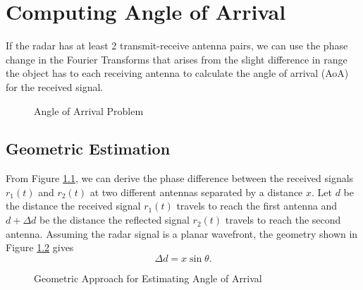 \chapter{Computing Angle of Arrival}
If the radar has at least 2 transmit-receive antenna pairs, we can use the
phase change in the Fourier Transforms that arises from the slight difference
in range the object has to each receiving antenna to calculate the angle of
arrival (AoA) for the received signal. 

\begin{figure}[h]
	\center
	\caption{Angle of Arrival Problem}
	\label{fig:angle-of-arrival}
\end{figure}

\section{Geometric Estimation}
From Figure \ref{fig:angle-of-arrival}, we can derive the phase difference
between the received signals $r_1(t)$ and $r_2(t)$ at two different antennas
separated by a distance $x$. Let $d$ be the distance the received signal
$r_1(t)$ travels to reach the first antenna  and $ d + \Delta d$ be the distance
the reflected signal $r_2(t)$ travels to reach the second antenna. Assuming the
radar signal is a planar wavefront, the geometry shown in Figure
\ref{fig:geometric-aoa} gives
\begin{equation}
	\Delta d = x \sin \theta. 
\end{equation}
\begin{figure}
	\center
	\caption{Geometric Approach for Estimating Angle of Arrival}
	\label{fig:geometric-aoa}
\end{figure}


